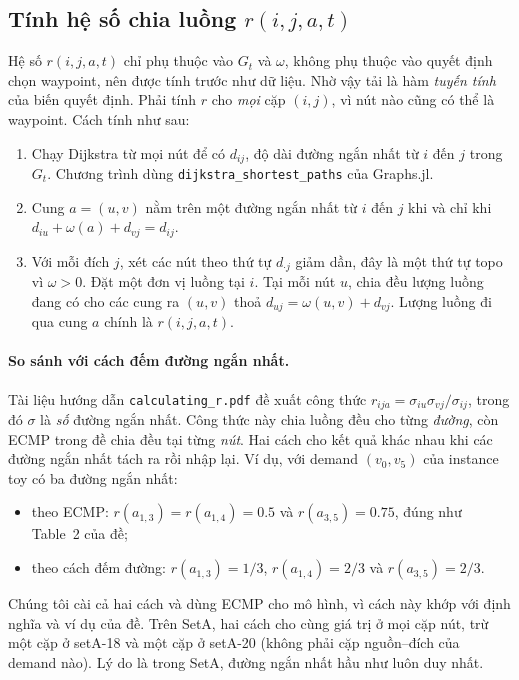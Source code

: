 \documentclass[11pt,a4paper]{article}
\begin{document}
\subsection{Tính hệ số chia luồng $r(i,j,a,t)$}\label{sec:r}

Hệ số $r(i,j,a,t)$ chỉ phụ thuộc vào $G_t$ và $\omega$, không phụ thuộc vào quyết định chọn waypoint, nên được tính trước như dữ liệu.
Nhờ vậy tải là hàm \emph{tuyến tính} của biến quyết định.
Phải tính $r$ cho \emph{mọi} cặp $(i,j)$, vì nút nào cũng có thể là waypoint.
Cách tính như sau:
\begin{enumerate}
\item Chạy Dijkstra từ mọi nút để có $d_{ij}$, độ dài đường ngắn nhất từ $i$ đến $j$ trong $G_t$. Chương trình dùng \texttt{dijkstra\_shortest\_paths} của Graphs.jl.
\item Cung $a=(u,v)$ nằm trên một đường ngắn nhất từ $i$ đến $j$ khi và chỉ khi $d_{iu}+\omega(a)+d_{vj}=d_{ij}$.
\item Với mỗi đích $j$, xét các nút theo thứ tự $d_{\cdot j}$ giảm dần, đây là một thứ tự topo vì $\omega>0$. Đặt một đơn vị luồng tại $i$. Tại mỗi nút $u$, chia đều lượng luồng đang có cho các cung ra $(u,v)$ thoả $d_{uj}=\omega(u,v)+d_{vj}$. Lượng luồng đi qua cung $a$ chính là $r(i,j,a,t)$.
\end{enumerate}

\paragraph{So sánh với cách đếm đường ngắn nhất.}
Tài liệu hướng dẫn \texttt{calculating\_r.pdf} đề xuất công thức $r_{ija}=\sigma_{iu}\sigma_{vj}/\sigma_{ij}$, trong đó $\sigma$ là \emph{số} đường ngắn nhất.
Công thức này chia luồng đều cho từng \emph{đường}, còn ECMP trong đề chia đều tại từng \emph{nút}.
Hai cách cho kết quả khác nhau khi các đường ngắn nhất tách ra rồi nhập lại.
Ví dụ, với demand $(v_0,v_5)$ của instance toy có ba đường ngắn nhất:
\begin{itemize}
\item theo ECMP: $r(a_{1,3})=r(a_{1,4})=0.5$ và $r(a_{3,5})=0.75$, đúng như Table~2 của đề;
\item theo cách đếm đường: $r(a_{1,3})=1/3$, $r(a_{1,4})=2/3$ và $r(a_{3,5})=2/3$.
\end{itemize}
Chúng tôi cài cả hai cách và dùng ECMP cho mô hình, vì cách này khớp với định nghĩa và ví dụ của đề.
Trên SetA, hai cách cho cùng giá trị ở mọi cặp nút, trừ một cặp ở setA-18 và một cặp ở setA-20 (không phải cặp nguồn--đích của demand nào).
Lý do là trong SetA, đường ngắn nhất hầu như luôn duy nhất.
\end{document}
